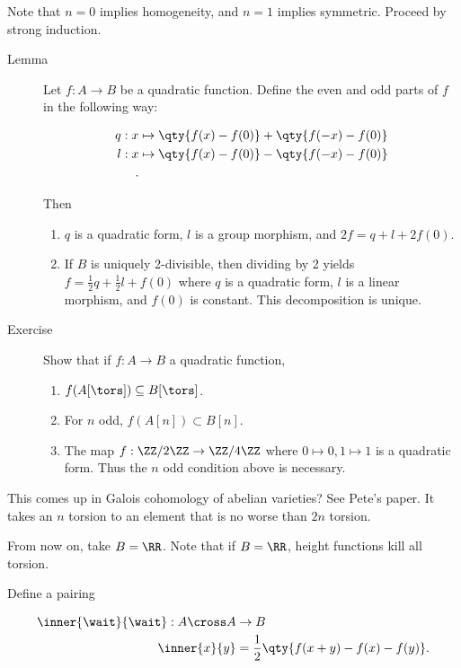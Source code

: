 Note that \(n=0\) implies homogeneity, and \(n=1\) implies symmetric.
Proceed by strong induction.

\begin{description}
\item[Lemma]
Let \(f: A\to B\) be a quadratic function. Define the even and odd parts
of \(f\) in the following way:

\begin{align*}
q: x &\mapsto \qty{ f(x) - f(0) } + \qty{ f(-x) - f(0)  } \\
l: x &\mapsto \qty{ f(x) - f(0) } - \qty{ f(-x) - f(0)  } \\
.\end{align*}

Then

\begin{enumerate}
\def\labelenumi{\alph{enumi}.}
\item
  \(q\) is a quadratic form, \(l\) is a group morphism, and
  \(2f = q + l + 2f(0)\).
\item
  If \(B\) is uniquely 2-divisible, then dividing by 2 yields
  \(f = \frac 1 2 q + \frac 1 2 l + f(0)\) where \(q\) is a quadratic
  form, \(l\) is a linear morphism, and \(f(0)\) is constant. This
  decomposition is unique.
\end{enumerate}
\item[Exercise]
Show that if \(f: A\to B\) a quadratic function,

\begin{enumerate}
\def\labelenumi{\alph{enumi}.}
\item
  \(f(A[\tors]) \subseteq B[\tors]\).
\item
  For \(n\) odd, \(f(A[n]) \subset B[n]\).
\item
  The map \(f: \ZZ/2\ZZ \to \ZZ/4\ZZ\) where \(0\mapsto 0, 1\mapsto 1\)
  is a quadratic form. Thus the \(n\) odd condition above is necessary.
\end{enumerate}
\end{description}

This comes up in Galois cohomology of abelian varieties? See Pete's
paper. It takes an \(n\) torsion to an element that is no worse than
\(2n\) torsion.

From now on, take \(B = \RR\). Note that if \(B=\RR\), height functions
kill all torsion.

Define a pairing

\begin{align*}
\inner{\wait}{\wait}: A\cross A &\to B \\
\inner{x}{y} &= \frac 1 2 \qty{ f(x+y) - f(x) - f(y)  }
.\end{align*}

